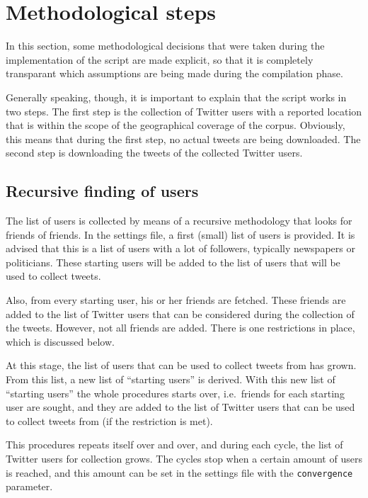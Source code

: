 \documentclass[a4paper,10pt]{article}
\begin{document}
\section{Methodological steps}

In this section, some methodological decisions that were taken during the implementation of the script are made explicit, so that it is completely transparant which assumptions are being made during the compilation phase.

Generally speaking, though, it is important to explain that the script works in two steps. The first step is the collection of Twitter users with a reported location that is within the scope of the geographical coverage of the corpus. Obviously, this means that during the first step, no actual tweets are being downloaded. The second step is downloading the tweets of the collected Twitter users.

\subsection{Recursive finding of users}

The list of users is collected by means of a recursive methodology that looks for friends of friends. In the settings file, a first (small) list of users is provided. It is advised that this is a list of users with a lot of followers, typically newspapers or politicians. These starting users will be added to the list of users that will be used to collect tweets.

Also, from every starting user, his or her friends are fetched. These friends are added to the list of Twitter users that can be considered during the collection of the tweets. However, not all friends are added. There is one restrictions in place, which is discussed below.

At this stage, the list of users that can be used to collect tweets from has grown. From this list, a new list of ``starting users'' is derived. With this new list of ``starting users'' the whole procedures starts over, i.e.~friends for each starting user are sought, and they are added to the list of Twitter users that can be used to collect tweets from (if the restriction is met).

This procedures repeats itself over and over, and during each cycle, the list of Twitter users for collection grows. The cycles stop when a certain amount of users is reached, and this amount can be set in the settings file with the \texttt{convergence} parameter.
\end{document}
